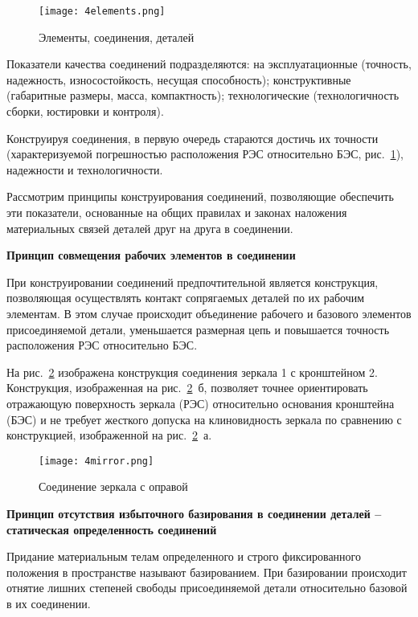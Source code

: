 \begin{figure}[H]
	\caption{Элементы, соединения, деталей}
	\texttt{[image: 4elements.png]}
	\label{pic:4elements}
\end{figure}

Показатели качества соединений подразделяются: на эксплуатационные (точность, надежность, износостойкость, несущая способность); конструктивные (габаритные размеры, масса, компактность); технологические (технологичность сборки, юстировки и контроля).

Конструируя соединения, в первую очередь стараются достичь их точности (характеризуемой погрешностью расположения РЭС относительно БЭС, рис.~\ref{pic:4elements}), надежности и технологичности.

Рассмотрим принципы конструирования соединений, позволяющие обеспечить эти показатели, основанные на общих правилах и законах наложения материальных связей деталей друг на друга в соединении.

\begin{flushleft}
\textbf{Принцип совмещения рабочих элементов в соединении}
\end{flushleft}

При конструировании соединений предпочтительной является конструкция, позволяющая осуществлять контакт сопрягаемых деталей по их рабочим элементам. В этом случае происходит объединение рабочего и базового элементов присоединяемой детали, уменьшается размерная цепь и повышается точность расположения РЭС относительно БЭС.

На рис.~\ref{pic:4mirror} изображена конструкция соединения зеркала 1 с кронштейном 2. Конструкция, изображенная на рис.~\ref{pic:4mirror}~б, позволяет точнее ориентировать отражающую поверхность зеркала (РЭС) относительно основания кронштейна (БЭС) и не требует жесткого допуска на клиновидность зеркала по сравнению с конструкцией, изображенной на рис.~\ref{pic:4mirror}~а.

\begin{figure}[H]
	\caption{Соединение зеркала с оправой}
	\texttt{[image: 4mirror.png]}
	\label{pic:4mirror}
\end{figure}

\begin{flushleft}
\textbf{Принцип отсутствия избыточного базирования в соединении деталей -- статическая определенность соединений}
\end{flushleft}

Придание материальным телам определенного и строго фиксированного положения в пространстве называют базированием. При базировании происходит отнятие лишних степеней свободы присоединяемой детали относительно базовой в их соединении.

